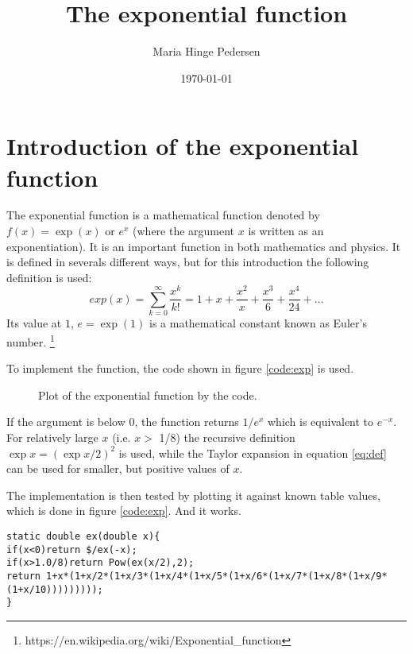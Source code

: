 \documentclass[a4paper,12pt]{article}
\begin{document}
\title{The exponential function}
\author{Maria Hinge Pedersen}
\date{\today}
\maketitle
\section{Introduction of the exponential function}
The exponential function is a mathematical function denoted by $f(x)=\exp(x)$ or $e^x$ (where the argument $x$ is written as an exponentiation).
It is an important function in both mathematics and physics.
It is defined in severals different ways, but for this introduction the following definition is used:
\begin{equation} \label{eq:def}
	exp(x) = \sum_{k=0}^{\infty} \frac{x^k}{k!}= 1+x+\frac{x^2}{x}+\frac{x^3}{6}+\frac{x^4}{24}+\ldots
\end{equation}
Its value at $1$, $e = \exp(1)$ is a mathematical constant known as Euler's number. \footnote{https://en.wikipedia.org/wiki/Exponential\_function} \

To implement the function, the code shown in figure \ref{code:exp} is used.

\begin{figure}\label{fig:plot}
	\centering
		
	\caption{Plot of the exponential function by the code.}
\end{figure}

If the argument is below $0$, the function returns $1/e^x$ which is equivalent to $e^{-x}$.
For relatively large $x$ (i.e. $x>$ 1/8) the recursive definition $\exp{x}=(\exp{x/2})^2$ is used, while the Taylor expansion in equation \ref{eq:def} can be used for smaller, but positive values of $x$.

The implementation is then tested by plotting it against known table values, which is done in figure \ref{code:exp}.
And it works.

\begin{lstlisting}[breaklines]
static double ex(double x){
if(x<0)return $/ex(-x);
if(x>1.0/8)return Pow(ex(x/2),2);
return 1+x*(1+x/2*(1+x/3*(1+x/4*(1+x/5*(1+x/6*(1+x/7*(1+x/8*(1+x/9*(1+x/10)))))))));
}
\end{lstlisting} \label{code:exp}
\end{document}
